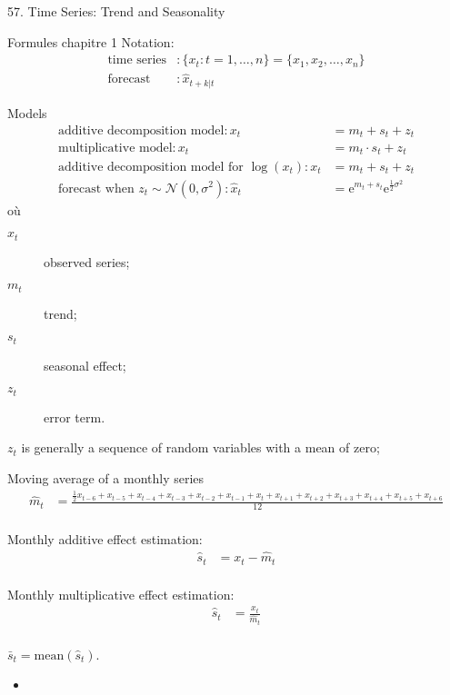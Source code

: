\documentclass[12pt, titlepage, french]{report}
\begin{document}
\begin{CHPT_SUMM_AUTO}[label = {L.-57}]{57. Time Series: Trend and Seasonality}
\begin{itemize}
\begin{itemize}
		\end{itemize}
\end{itemize}

\begin{FORMULA_SUMM}{Formules chapitre 1}
Notation:
	\begin{align*}
	\text{time series}&:	
		\{x_{t} : t = 1, \dots, n\} 
	= 	\{x_{1}, x_{2}, \dots, x_{n}\}	\\
	\text{forecast}	&:	
		\hat{x}_{t + k | t}
	\end{align*}
	
Models
	\begin{align*}
	\text{additive decomposition model}	:	
	x_{t}	
	&=	m_{t} + s_{t} + z_{t}		\\
	\text{multiplicative model}	:	
	x_{t}	
	&=	m_{t} \cdot s_{t} + z_{t}		\\
	\text{additive decomposition model for }\log(x_{t})	:	
	x_{t}	
	&=	m_{t} + s_{t} + z_{t}	\\
	\text{forecast when }z_{t} \sim \mathcal{N}(0, \sigma^{2})	:
	\hat{x}_{t}	
	&=	\text{e}^{m_{t} + s_{t}}\text{e}^{\frac{1}{2}\sigma^{2}}
	\end{align*}
où
	\begin{multicols*}{2}
	\begin{description}
	\item[$x_{t}$]	observed series;
	\item[$m_{t}$]	trend;
	\item[$s_{t}$]	seasonal effect;
	\item[$z_{t}$]	error term.
	\end{description}
	\end{multicols*}
$z_{t}$ is generally a sequence of random variables with a mean of zero;

Moving average of a monthly series
	\begin{align*}
	\hat{m}_{t}
	&=	\frac{\frac{1}{2} x_{t - 6} + x_{t - 5} + x_{t - 4} + x_{t - 3} + x_{t - 2} + x_{t - 1} + x_{t} + x_{t + 1} + x_{t + 2} + x_{t + 3} + x_{t + 4} + x_{t + 5} + x_{t + 6}}{12}	\\
	\end{align*}
	
Monthly additive effect estimation:
	\begin{align*}
	\hat{s}_{t} 
	&= 	x_{t} - \hat{m}_{t}	\\
	\end{align*}
	
Monthly multiplicative effect estimation:
	\begin{align*}
	\hat{s}_{t} 
	&= 	\frac{x_{t}}{\hat{m}_{t}}	\\
	\end{align*}
	
$\bar{s}_{t} = \text{mean}(\hat{s}_{t})$.


\end{FORMULA_SUMM}
\tcbline
	\begin{itemize}
		\item	
	\end{itemize}
\end{CHPT_SUMM_AUTO}
\end{document}
